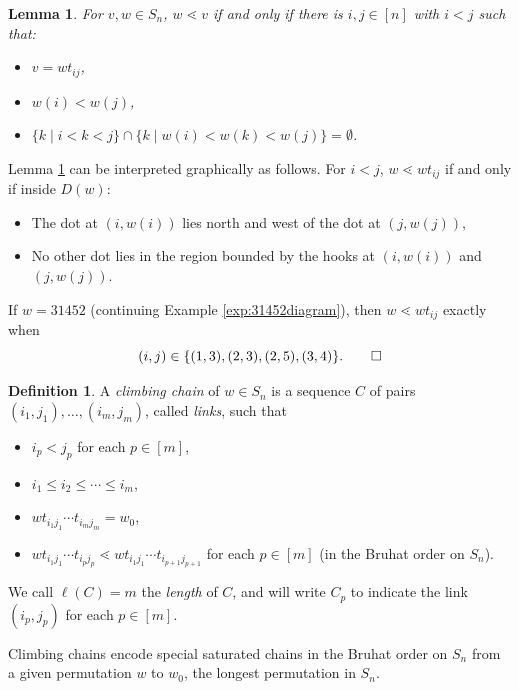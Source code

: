 \documentclass[11pt]{amsart}
\newtheorem{lemma}[theorem]{Lemma}
\theoremstyle{definition}
\newtheorem{definition}[theorem]{Definition}
\newenvironment{example}
{\pushQED{\qed}\renewcommand{\qedsymbol}{$\diamondsuit$}\examplex}
{\popQED\endexamplex}
\theoremstyle{named}
\begin{document}
	\begin{lemma}
		\label{lem:cover}
		For $v,w\in S_n$, $w\lessdot v$ if and only if there is $i,j\in [n]$ with $i<j$ such that:
		\begin{itemize}
			\item $v=wt_{ij}$,
			\item $w(i)<w(j)$,
			\item $\{k \mid i<k<j\}\cap \{k\mid w(i)<w(k)<w(j) \}=\emptyset$.
		\end{itemize}
	\end{lemma}

	Lemma \ref{lem:cover} can be interpreted graphically as follows. For $i<j$, $w\lessdot wt_{ij}$ if and only if inside $D(w)$:
	\begin{itemize}
		\item The dot at $(i,w(i))$ lies north and west of the dot at $(j,w(j))$,
		\item No other dot lies in the region bounded by the hooks at $(i,w(i))$ and $(j,w(j))$.
	\end{itemize}

	\begin{example}
		If $w=31452$ (continuing Example \ref{exp:31452diagram}), then $w\lessdot wt_{ij}$ exactly when 
		\[(i,j)\in \{(1,3),(2,3),(2,5),(3,4)\}.\qedhere\]
	\end{example}
	

	
	\begin{definition}
		A \emph{climbing chain} of $w\in S_n$ is a sequence $C$ of pairs $(i_1,j_1),\ldots,(i_m,j_m)$, called \emph{links}, such that 
		\begin{itemize}
			\item $i_p<j_p$ for each $p\in [m]$, 
			\item $i_1\leq i_2\leq \cdots \leq i_m$,
			\item $wt_{i_1j_1}\cdots t_{i_mj_m} = w_0$,
			\item $wt_{i_1j_1}\cdots t_{i_pj_p} \lessdot wt_{i_1j_1}\cdots t_{i_{p+1}j_{p+1}}$ for each $p\in [m]$ (in the Bruhat order on $S_n$).
		\end{itemize}
		We call $\ell(C)=m$ the \emph{length} of $C$, and will write $C_p$ to indicate the link $(i_p,j_p)$ for each $p\in [m]$.
	\end{definition}
	Climbing chains encode special saturated chains in the Bruhat order on $S_n$ from a given permutation $w$ to $w_0$, the longest permutation in $S_n$.
	
\end{document}

